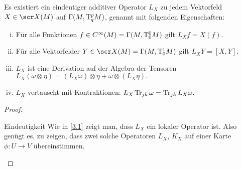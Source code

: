 \begin{st} \label{5.19}
    Es existiert ein eindeutiger additiver Operator $L_X$ zu jedem Vektorfeld $X \in \scr X(M)$ auf $\Gamma(M, \mathrm{T}_q^p M)$, genannt  mit folgenden Eigenschaften:
    \begin{enumerate}[(i)]
        \item
            Für alle Funktionen $f \in C^\infty(M) = \Gamma(M, \mathrm{T}_0^0 M)$ gilt
            \begin{math}
                L_X f = X(f).
            \end{math}
        \item
            Für alle Vektorfelder $Y \in \scr X(M) = \Gamma(M, \T_0^1 M)$ gilt
            \begin{math}
                L_X Y = [X, Y].
            \end{math}
        \item
            $L_X$ ist eine Derivation auf der Algebra der Tensoren
            \begin{math}
                L_X(\omega \otimes \eta) = (L_X \omega) \otimes \eta + \omega \otimes (L_X \eta).
            \end{math}
        \item
            $L_X$ vertauscht mit Kontraktionen:
            \begin{math}
                L_X \operatorname{Tr}_{jk} \omega = \operatorname{Tr}_{jk} L_X \omega.
            \end{math}
    \end{enumerate}
    \begin{proof}
        \begin{seg}{Eindeutigkeit}
            Wie in \ref{3.1} zeigt man, dass $L_X$ ein lokaler Operator ist.
            Also genügt es, zu zeigen, dass zwei solche Operatoren $L_X$, $K_X$ auf einer Karte $\phi: U \to V$ übereinstimmen.


\end{seg}
\end{proof}
\end{st}
